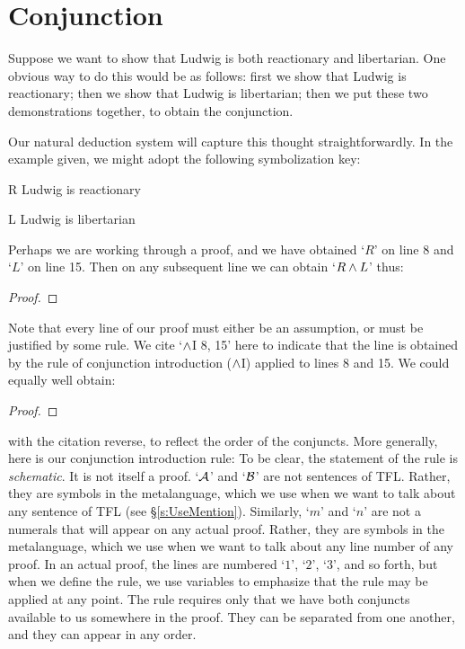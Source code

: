 \section{Conjunction}
Suppose we want to show that Ludwig is both reactionary and libertarian. One obvious way to do this would be as follows: first we show that Ludwig is reactionary; then we show that Ludwig is libertarian; then we put these two demonstrations together, to obtain the conjunction.

Our natural deduction system will capture this thought straightforwardly. In the example given, we might adopt the following symbolization key:
	\begin{ekey}
		\item[R] Ludwig is reactionary
		\item[L] Ludwig is libertarian
	\end{ekey}
Perhaps we are working through a proof, and we have obtained `$R$' on line 8 and `$L$' on line 15. Then on any subsequent line we can obtain `$R \wedge L$' thus:
\begin{proof}
	 
\end{proof}
Note that every line of our proof must either be an assumption, or must be justified by some rule. We cite `$\wedge$I 8, 15' here to indicate that the line is obtained by the rule of conjunction introduction ($\wedge$I) applied to lines 8 and 15. We could equally well obtain:
\begin{proof}
	 
\end{proof}
with the citation reverse, to reflect the order of the conjuncts. More generally, here is our conjunction introduction rule:
To be clear, the statement of the rule is \emph{schematic}. It is not itself a proof.  `$\mathcal{A}$' and `$\mathcal{B}$' are not sentences of TFL. Rather, they are symbols in the metalanguage, which we use when we want to talk about any sentence of TFL (see \S\ref{s:UseMention}). Similarly, `$m$' and `$n$' are not a numerals that will appear on any actual proof. Rather, they are symbols in the metalanguage, which we use when we want to talk about any line number of any proof. In an actual proof, the lines are numbered `$1$', `$2$', `$3$', and so forth, but when we define the rule, we use variables to emphasize that the rule may be applied at any point. The rule requires only that we have both conjuncts available to us somewhere in the proof. They can be separated from one another, and they can appear in any order. 

